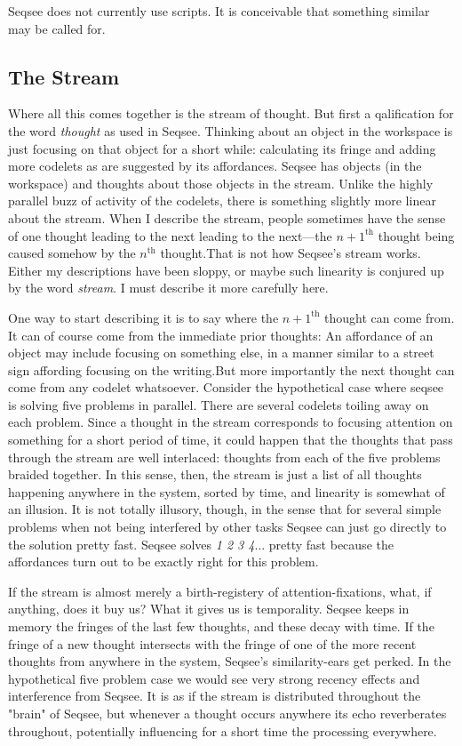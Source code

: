 \documentclass[letterpaper]{article}
\begin{document}
Seqsee does not currently use scripts.  It is conceivable that something similar may be called for. 

\subsection{The Stream}
\label{sec:stream}

Where all this comes together is the stream of thought. But first a qalification for the word \emph{thought} as used in Seqsee. Thinking about an object in the workspace is just focusing on that object for a short while: calculating its fringe and adding more codelets as are suggested by its affordances. Seqsee has objects (in the workspace) and thoughts about those objects in the stream.  Unlike the highly parallel buzz of activity of the codelets, there is something slightly more linear about the stream.  When I describe the stream, people sometimes have the sense of one thought leading to the next leading to the next---the $n+1^{\mathrm{th}}$ thought being caused somehow by the $n^\mathrm{th}$ thought.That is not how Seqsee's stream works. Either my descriptions have been sloppy, or maybe such linearity is conjured up by the word \emph{stream}. I must describe it more carefully here.

One way to start describing it is to say where the $n+1^{\mathrm{th}}$ thought can come from.  It can of course come  from the immediate prior thoughts: An affordance of an object may include focusing on something else, in a manner similar to a street sign affording focusing on the writing.But more importantly the next thought can come from any codelet whatsoever.  Consider the hypothetical case where seqsee is solving five problems in parallel.  There are several codelets toiling away on each problem.  Since a thought in the stream corresponds to focusing attention on something for a short period of time, it could happen that the thoughts that pass through the stream are well interlaced: thoughts from each of the five problems braided together. In this sense, then, the stream is just a list of all thoughts happening anywhere in the system, sorted by time, and linearity is somewhat of an illusion. It is not totally illusory, though, in the sense that for several simple problems when not being interfered by other tasks Seqsee can just go directly to the solution pretty fast. Seqsee solves \emph{1 2 3 4$\ldots$} pretty fast because the affordances turn out to be exactly right for this problem.

If the stream is almost merely a birth-registery of attention-fixations, what, if anything, does it buy us? What it gives us is temporality.  Seqsee keeps in memory the fringes of the last few thoughts, and these decay with time.  If the fringe of a new thought intersects with the fringe of one of the more recent thoughts from anywhere in the system, Seqsee's similarity-ears get perked.  In the hypothetical five problem case we would see very strong recency effects and interference from Seqsee.  It is as if the stream is distributed throughout the "brain" of Seqsee, but whenever a thought occurs anywhere its echo reverberates throughout, potentially influencing for a short time the processing everywhere.
\end{document}
